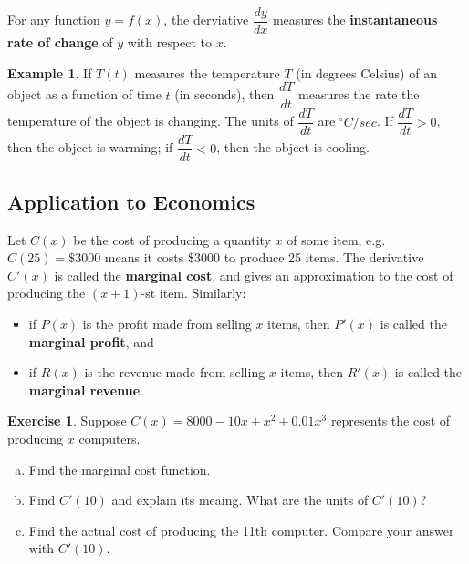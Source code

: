 \documentclass[11pt,reqno,final]{amsart}
\numberwithin{figure}{section}
\theoremstyle{definition} %
\newtheorem{example}[equation]{Example}%
\newtheorem{exercise}[question]{Exercise}
\begin{document}
\begin{framed}
        For any function $y = f(x)$, the derviative $\dfrac{dy}{dx}$ measures the
        \textbf{instantaneous rate of change} of $y$ with respect to $x$.
\end{framed}

\begin{example}
        If $T(t)$ measures the temperature $T$ (in degrees Celsius) of an object as a function of time $t$ (in seconds),
        then $\dfrac{dT}{dt}$ measures the rate the temperature of the object is changing.
        The units of $\dfrac{dT}{dt}$ are $^\circ C/sec$.
        If $\dfrac{dT}{dt} > 0$, then the object is warming;
        if $\dfrac{dT}{dt} < 0$, then the object is cooling.
\end{example}

\subsection*{Application to Economics}
Let $C(x)$ be the cost of producing a quantity $x$ of some item,
e.g. $C(25) = \$ 3000$ means it costs \$3000 to produce 25 items.
The derivative $C'(x)$ is called the \textbf{marginal cost}, and gives an approximation to the cost of producing the $(x+1)$-st item.
Similarly:
\begin{itemize}
\item if $P(x)$ is the profit made from selling $x$ items, then $P'(x)$ is called the \textbf{marginal profit}, and
\item if $R(x)$ is the revenue made from selling $x$ items, then $R'(x)$ is called the \textbf{marginal revenue}.
\end{itemize}

\begin{exercise}
        Suppose $C(x) = 8000-10x+x^2 + 0.01x^3$ represents the cost of producing $x$ computers.
        \begin{enumerate}[(a)]
        \item Find the marginal cost function.
                \vfill
        \item Find $C'(10)$ and explain its meaing. What are the units of $C'(10)$?
                \vfill
        \item Find the actual cost of producing the 11th computer. Compare your answer with $C'(10)$.
                \vfill
        \end{enumerate}
\end{exercise}

\newpage
\end{document}

